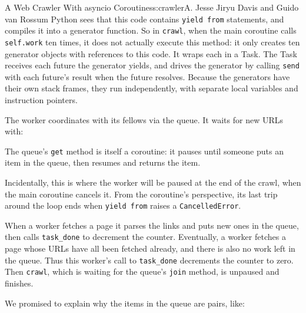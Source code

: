 \begin{aosachapter}{A Web Crawler With asyncio Coroutines}{s:crawler}{A. Jesse Jiryu Davis and Guido van Rossum}
Python sees that this code contains \texttt{yield from} statements, and
compiles it into a generator function. So in \texttt{crawl}, when the
main coroutine calls \texttt{self.work} ten times, it does not actually
execute this method: it only creates ten generator objects with
references to this code. It wraps each in a Task. The Task receives each
future the generator yields, and drives the generator by calling
\texttt{send} with each future's result when the future resolves.
Because the generators have their own stack frames, they run
independently, with separate local variables and instruction pointers.

The worker coordinates with its fellows via the queue. It waits for new
URLs with:

\begin{Shaded}
\begin{Highlighting}[]
      
\end{Highlighting}
\end{Shaded}

The queue's \texttt{get} method is itself a coroutine: it pauses until
someone puts an item in the queue, then resumes and returns the item.

Incidentally, this is where the worker will be paused at the end of the
crawl, when the main coroutine cancels it. From the coroutine's
perspective, its last trip around the loop ends when \texttt{yield from}
raises a \texttt{CancelledError}.

When a worker fetches a page it parses the links and puts new ones in
the queue, then calls \texttt{task\_done} to decrement the counter.
Eventually, a worker fetches a page whose URLs have all been fetched
already, and there is also no work left in the queue. Thus this worker's
call to \texttt{task\_done} decrements the counter to zero. Then
\texttt{crawl}, which is waiting for the queue's \texttt{join} method,
is unpaused and finishes.

We promised to explain why the items in the queue are pairs, like:

\begin{Shaded}
\begin{Highlighting}[]
\NormalTok{(}\NormalTok{, }\NormalTok{)}
\end{Highlighting}
\end{Shaded}


\end{aosachapter}
